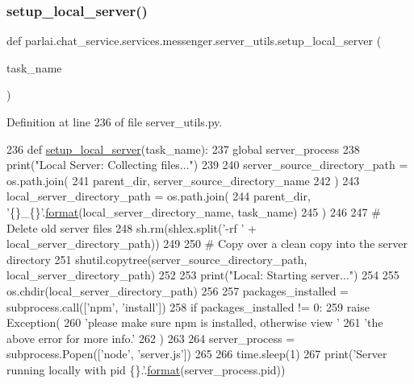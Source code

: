 \subsubsection{\texorpdfstring{setup\+\_\+local\+\_\+server()}{setup\_local\_server()}}
{\footnotesize\ttfamily def parlai.\+chat\+\_\+service.\+services.\+messenger.\+server\+\_\+utils.\+setup\+\_\+local\+\_\+server (\begin{DoxyParamCaption}\item[{}]{task\+\_\+name }\end{DoxyParamCaption})}



Definition at line 236 of file server\+\_\+utils.\+py.


\begin{DoxyCode}
236 \textcolor{keyword}{def }\hyperlink{namespaceparlai_1_1mturk_1_1core_1_1server__utils_a9d4c4937ea60bd74630a44739e825ebf}{setup\_local\_server}(task\_name):
237     \textcolor{keyword}{global} server\_process
238     print(\textcolor{stringliteral}{"Local Server: Collecting files..."})
239 
240     server\_source\_directory\_path = os.path.join(
241         parent\_dir, server\_source\_directory\_name
242     )
243     local\_server\_directory\_path = os.path.join(
244         parent\_dir, \textcolor{stringliteral}{'\{\}\_\{\}'}.\hyperlink{namespaceparlai_1_1chat__service_1_1services_1_1messenger_1_1shared__utils_a32e2e2022b824fbaf80c747160b52a76}{format}(local\_server\_directory\_name, task\_name)
245     )
246 
247     \textcolor{comment}{# Delete old server files}
248     sh.rm(shlex.split(\textcolor{stringliteral}{'-rf '} + local\_server\_directory\_path))
249 
250     \textcolor{comment}{# Copy over a clean copy into the server directory}
251     shutil.copytree(server\_source\_directory\_path, local\_server\_directory\_path)
252 
253     print(\textcolor{stringliteral}{"Local: Starting server..."})
254 
255     os.chdir(local\_server\_directory\_path)
256 
257     packages\_installed = subprocess.call([\textcolor{stringliteral}{'npm'}, \textcolor{stringliteral}{'install'}])
258     \textcolor{keywordflow}{if} packages\_installed != 0:
259         \textcolor{keywordflow}{raise} Exception(
260             \textcolor{stringliteral}{'please make sure npm is installed, otherwise view '}
261             \textcolor{stringliteral}{'the above error for more info.'}
262         )
263 
264     server\_process = subprocess.Popen([\textcolor{stringliteral}{'node'}, \textcolor{stringliteral}{'server.js'}])
265 
266     time.sleep(1)
267     print(\textcolor{stringliteral}{'Server running locally with pid \{\}.'}.\hyperlink{namespaceparlai_1_1chat__service_1_1services_1_1messenger_1_1shared__utils_a32e2e2022b824fbaf80c747160b52a76}{format}(server\_process.pid))

\end{DoxyCode}
